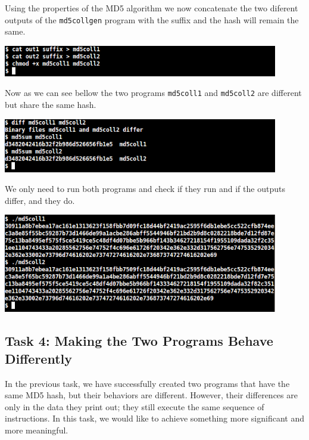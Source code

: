 \documentclass[a4paper]{article}
\begin{document}
Using the properties of the MD5 algorithm we now concatenate the two diferent outputs of the \texttt{md5collgen} program with the suffix and the hash will remain the same.

\bigskip

\includegraphics[width=0.9\textwidth]{bash/md5collcat.png}

\bigskip

Now as we can see bellow the two programs \texttt{md5coll1} and \texttt{md5coll2} are different but share the same hash.

\bigskip

\includegraphics[width=0.9\textwidth]{bash/md5colldiff.png}

\bigskip

We only need to run both programs and check if they run and if the outputs differ, and they do.

\bigskip

\includegraphics[width=0.9\textwidth]{bash/md5collexec.png}

\bigskip

\newpage

\subsection{Task 4: Making the Two Programs Behave Differently}

In the previous task, we have successfully created two programs that have the same MD5 hash, but their behaviors are different. However, their differences are only in the data they print out; they still execute the same sequence of instructions. In this task, we would like to achieve something more significant and more meaningful.
\end{document}
